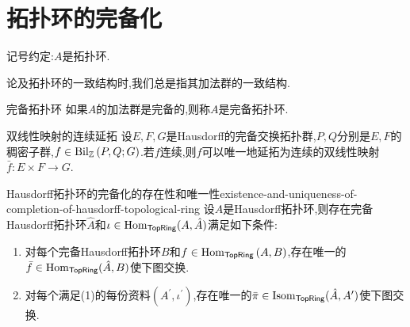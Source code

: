 \section{拓扑环的完备化}

记号约定:$A$是拓扑环.

\begin{convention}{}{}
	论及拓扑环的一致结构时,我们总是指其加法群的一致结构.
\end{convention}

\begin{definition}{完备拓扑环}{}
	如果$A$的加法群是完备的,则称$A$是完备拓扑环.	
\end{definition}

\begin{theorem}{双线性映射的连续延拓}{}
	设$E,F,G$是Hausdorff的完备交换拓扑群,$P,Q$分别是$E,F$的稠密子群,$f\in\operatorname{Bil}_{\mathbb{Z}}\left(P,Q;G\right)$.若$f$连续,则$f$可以唯一地延拓为连续的双线性映射$\bar{f}:E\times F\to G$.
\end{theorem}

\begin{proposition}{Hausdorff拓扑环的完备化的存在性和唯一性}{existence-and-uniqueness-of-completion-of-hausdorff-topological-ring}
	设$A$是Hausdorff拓扑环,则存在完备Hausdorff拓扑环$\hat{A}$和$\iota\in\operatorname{Hom}_{\mathsf{TopRing}}(A,\hat{A})$满足如下条件:
	\begin{enumerate}
		\item 对每个完备Hausdorff拓扑环$B$和$f\in\operatorname{Hom}_{\mathsf{TopRing}}\left(A,B\right)$,存在唯一的$\bar{f}\in\operatorname{Hom}_{\mathsf{TopRing}}(\hat{A},B)$使下图交换.
		\begin{center}
		\end{center}
		\item 对每个满足(1)的每份资料$\left(A^{\prime},\iota^{\prime}\right)$,存在唯一的$\bar{\pi}\in\operatorname{Isom}_{\mathsf{TopRing}}(\hat{A},A^{\prime})$使下图交换.
		\begin{center}
		\end{center}
	\end{enumerate}
\end{proposition}

